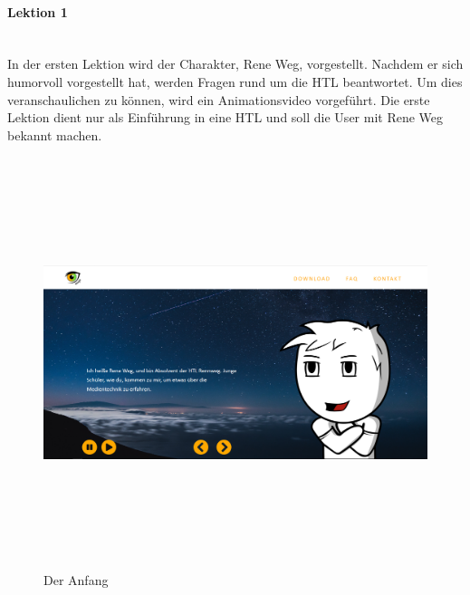 \paragraph{Lektion 1}\leavevmode \\
In der ersten Lektion wird der Charakter, Rene Weg, vorgestellt. Nachdem er sich humorvoll vorgestellt hat, werden Fragen rund um die HTL beantwortet. Um dies veranschaulichen zu können, wird ein Animationsvideo vorgeführt. Die erste Lektion dient nur als Einführung in eine HTL und soll die User mit Rene Weg bekannt machen. 
\begin{figure}[h]
	\centering
\includegraphics[width=12cm,height=12cm,keepaspectratio]{webseite_abb12} 
	\caption{Der Anfang}
\end{figure}
